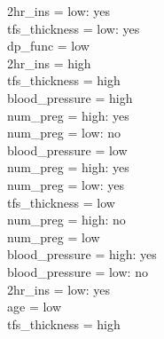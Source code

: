 \documentclass[12pt]{article}
\begin{document}
\textbar\quad \textbar\quad \textbar\quad \textbar\quad \textbar\quad \textbar\quad \textbar\quad 2hr\_ins = low: yes\\
\textbar\quad \textbar\quad \textbar\quad \textbar\quad \textbar\quad \textbar\quad tfs\_thickness = low: yes\\
\textbar\quad \textbar\quad \textbar\quad dp\_func = low\\
\textbar\quad \textbar\quad \textbar\quad \textbar\quad 2hr\_ins = high\\
\textbar\quad \textbar\quad \textbar\quad \textbar\quad \textbar\quad tfs\_thickness = high\\
\textbar\quad \textbar\quad \textbar\quad \textbar\quad \textbar\quad \textbar\quad blood\_pressure = high\\
\textbar\quad \textbar\quad \textbar\quad \textbar\quad \textbar\quad \textbar\quad \textbar\quad num\_preg = high: yes\\
\textbar\quad \textbar\quad \textbar\quad \textbar\quad \textbar\quad \textbar\quad \textbar\quad num\_preg = low: no\\
\textbar\quad \textbar\quad \textbar\quad \textbar\quad \textbar\quad \textbar\quad blood\_pressure = low\\
\textbar\quad \textbar\quad \textbar\quad \textbar\quad \textbar\quad \textbar\quad \textbar\quad num\_preg = high: yes\\
\textbar\quad \textbar\quad \textbar\quad \textbar\quad \textbar\quad \textbar\quad \textbar\quad num\_preg = low: yes\\
\textbar\quad \textbar\quad \textbar\quad \textbar\quad \textbar\quad tfs\_thickness = low\\
\textbar\quad \textbar\quad \textbar\quad \textbar\quad \textbar\quad \textbar\quad num\_preg = high: no\\
\textbar\quad \textbar\quad \textbar\quad \textbar\quad \textbar\quad \textbar\quad num\_preg = low\\
\textbar\quad \textbar\quad \textbar\quad \textbar\quad \textbar\quad \textbar\quad \textbar\quad blood\_pressure = high: yes\\
\textbar\quad \textbar\quad \textbar\quad \textbar\quad \textbar\quad \textbar\quad \textbar\quad blood\_pressure = low: no\\
\textbar\quad \textbar\quad \textbar\quad \textbar\quad 2hr\_ins = low: yes\\
\textbar\quad \textbar\quad age = low\\
\textbar\quad \textbar\quad \textbar\quad tfs\_thickness = high\\
\end{document}
